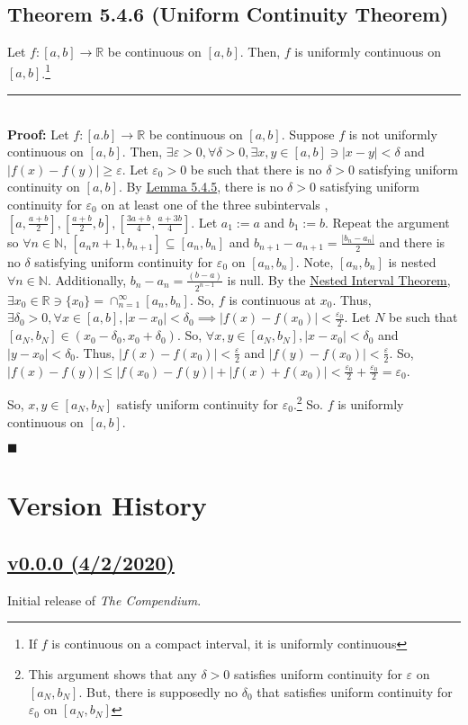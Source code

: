 \documentclass[11pt]{book}
\newcommand{\R}{\mathbb{R}}
\newcommand{\N}{\mathbb{N}}
\newcommand{\horline}{\noindent\rule{14.25cm}{0.6pt}\\}
\newcommand{\QED}{\begin{flushright}$\blacksquare$\end{flushright}}
\begin{document}
		\subsection{Theorem 5.4.6 (Uniform Continuity Theorem)}
		\label{subsec:theor546}
			\begin{theor}
				Let $f:[a,b] \to \R$ be continuous on $[a,b]$. Then, $f$ is uniformly continuous on $[a,b]$.\footnote{If $f$ is continuous on a compact interval, it is uniformly continuous}\hfill\break
				\horline
				\textbf{Proof:} Let $f:[a.b] \to \R$ be continuous on $[a,b]$. Suppose $f$ is not uniformly continuous on $[a,b]$. Then, 
				$\exists \varepsilon > 0, \forall \delta > 0, \exists x,y \in [a,b] \ni |x-y| < \delta$ and $|f(x) - f(y)| \geq \varepsilon$. 
				Let $\varepsilon_0 > 0$ be such that there is no $\delta > 0$ satisfying uniform continuity on $[a,b]$. By \hyperref[subsec:lemm545]{Lemma 5.4.5}, there is no $\delta > 0$ satisfying uniform continuity for $\varepsilon_0$ on at least one of the three subintervals ,$[a,\frac{a+b}{2}], [\frac{a+b}{2}, b],
				[\frac{3a+b}{4}, \frac{a+3b}{4}]$. Let $a_1 := a$ and $b_1:=b$. Repeat the argument so $\forall n \in \N$, $[a_n{n+1}, b_{n+1}] \subseteq
				[a_n,b_n]$ and $b_{n+1} - a_{n+1} = \frac{|b_n - a_n|}{2}$ and there is no $\delta$ satisfying uniform continuity for $\varepsilon_0$
				on $[a_n,b_n]$. Note, $[a_n,b_n]$ is nested $\forall n \in \N$. Additionally, $b_n - a_n = \frac{(b - a)}{2^{n-1}}$ is null. By the
				\hyperref[subsec:theor332]{Nested Interval Theorem}, $\exists x_0 \in \R \ni \{x_0\} = \cap_{n = 1}^{\infty}{[a_n,b_n]}$. So, $f$ is 
				continuous at $x_0$. Thus, $\exists \delta_0 > 0, \forall x \in [a,b], |x-x_0| < \delta_0 \implies |f(x) - f(x_0)| < \frac{\varepsilon_0}{2}$.
				Let $N$ be such that $[a_N,b_N] \in (x_0-\delta_0,x_0+\delta_0)$. So, $\forall x,y \in [a_N,b_N], |x - x_0| < \delta_0$ and 
				$|y-x_0| < \delta_0$. Thus, $|f(x) - f(x_0)| < \frac{\varepsilon}{2}$ and $|f(y) - f(x_0)| < \frac{\varepsilon}{2}$. So, 
				$|f(x) - f(y)| \leq |f(x_0) - f(y)| + |f(x) + f(x_0)| < \frac{\varepsilon_0}{2} + \frac{\varepsilon_0}{2} = \varepsilon_0$.

				So, $x,y \in [a_N,b_N]$ satisfy uniform continuity for $\varepsilon_0$.\footnote{This argument shows that any $\delta>0$ satisfies uniform
				continuity for $\varepsilon$ on $[a_N, b_N]$. But, there is supposedly no $\delta_0$ that satisfies uniform continuity for $\varepsilon_0$
				on $[a_N, b_N]$} So. $f$ is uniformly continuous on $[a,b]$.\QED 
			\end{theor}


\newpage
\section{Version History}
	\subsection{\href{https://www.overleaf.com/read/gyqrjdfnjyvb}{v0.0.0 (4/2/2020)}}
		Initial release of \emph{The Compendium}. 		
		
\end{document}
